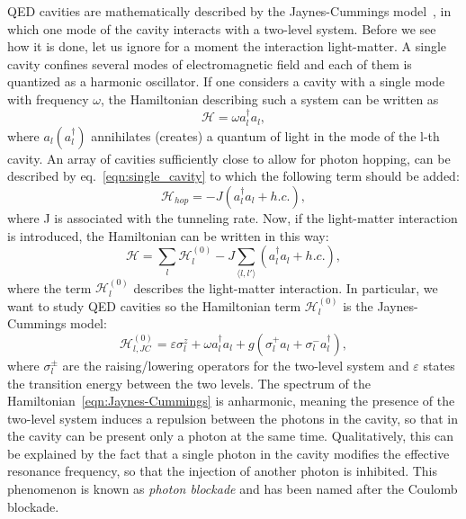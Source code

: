 QED cavities are mathematically described by the Jaynes-Cummings model~\cite{shore_knight}, in which one mode of the cavity interacts with a two-level system. Before we see how it is done, let us ignore for a moment the interaction light-matter. A single cavity confines several modes of electromagnetic field and each of them is quantized as a harmonic oscillator. If one considers a cavity with a single mode with frequency $\omega$, the Hamiltonian describing such a system can be written as
\begin{equation}
\label{eqn:single_cavity}
    \mathcal{H} = \omega a^{\dagger}_la_l,
\end{equation}
where $a_l (a_l^{\dagger})$ annihilates (creates) a quantum of light in the mode of the l-th cavity.
An array of cavities sufficiently close to allow for photon hopping, can be described by eq.~\ref{eqn:single_cavity} to which the following term should be added:
\begin{equation*}
    \mathcal{H}_{hop} = -J (a^{\dagger}_la_l + h.c.),
\end{equation*}
where J is associated with the tunneling rate.
Now, if the light-matter interaction is introduced, the Hamiltonian can be written in this way:
\begin{equation}
    \mathcal{H} = \sum_l \mathcal{H}_l^{(0)} - J \sum_{\langle l, l' \rangle}(a^{\dagger}_la_l + h.c.),
\end{equation}
where the term $\mathcal{H}_l^{(0)}$ describes the light-matter interaction. In particular, we want to study QED cavities so the Hamiltonian term $\mathcal{H}_l^{(0)}$ is the Jaynes-Cummings model:
\begin{equation}
\label{eqn:Jaynes-Cummings}
    \mathcal{H}_{l,JC}^{(0)} = \varepsilon \sigma^z_l + \omega a^{\dagger}_la_l + g(\sigma^+_l a_l + \sigma^-_l a_l^{\dagger}),
\end{equation}
where $\sigma^\pm_l$ are the raising/lowering operators for the two-level system and $\varepsilon$ states the transition energy between the two levels.
The spectrum of the Hamiltonian~\ref{eqn:Jaynes-Cummings} is anharmonic, meaning the presence of the two-level system induces a repulsion between the photons in the cavity, so that in the cavity can be present only a photon at the same time. Qualitatively, this can be explained by the fact that a single photon in the cavity modifies the effective resonance frequency, so that the injection of another photon is inhibited. This phenomenon is known as \emph{photon blockade} and has been named after the Coulomb blockade.

